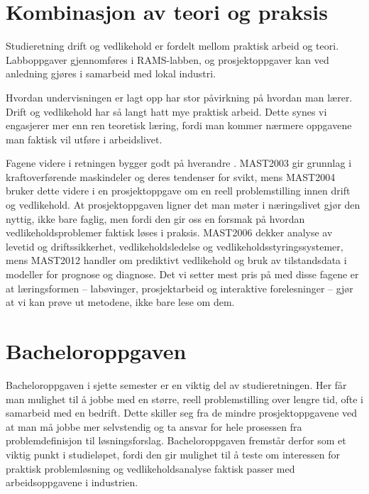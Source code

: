 \section*{Kombinasjon av teori og praksis}
Studieretning drift og vedlikehold er fordelt mellom praktisk arbeid og teori. Labboppgaver gjennomføres i RAMS-labben, og prosjektoppgaver kan ved anledning gjøres i samarbeid med lokal industri.

Hvordan undervisningen er lagt opp har stor påvirkning på hvordan man lærer. Drift og vedlikehold har så langt hatt mye praktisk arbeid. Dette synes vi engasjerer mer enn ren teoretisk læring, fordi man kommer nærmere oppgavene man faktisk vil utføre i arbeidslivet.

Fagene videre i retningen bygger godt på hverandre \parencite{mast2003, mast2004, mast2006, mast2012}. MAST2003 gir grunnlag i kraftoverførende maskindeler og deres tendenser for svikt, mens MAST2004 bruker dette videre i en prosjektoppgave om en reell problemstilling innen drift og vedlikehold. At prosjektoppgaven ligner det man møter i næringslivet gjør den nyttig, ikke bare faglig, men fordi den gir oss en forsmak på hvordan vedlikeholdsproblemer faktisk løses i praksis. MAST2006 dekker analyse av levetid og driftssikkerhet, vedlikeholdsledelse og vedlikeholdsstyringssystemer, mens MAST2012 handler om prediktivt vedlikehold og bruk av tilstandsdata i modeller for prognose og diagnose. Det vi setter mest pris på med disse fagene er at læringsformen -- labøvinger, prosjektarbeid og interaktive forelesninger -- gjør at vi kan prøve ut metodene, ikke bare lese om dem.

\section*{Bacheloroppgaven}
Bacheloroppgaven i sjette semester er en viktig del av studieretningen. Her får man mulighet til å jobbe med en større, reell problemstilling over lengre tid, ofte i samarbeid med en bedrift. Dette skiller seg fra de mindre prosjektoppgavene ved at man må jobbe mer selvstendig og ta ansvar for hele prosessen fra problemdefinisjon til løsningsforslag. Bacheloroppgaven fremstår derfor som et viktig punkt i studieløpet, fordi den gir mulighet til å teste om interessen for praktisk problemløsning og vedlikeholdsanalyse faktisk passer med arbeidsoppgavene i industrien.

